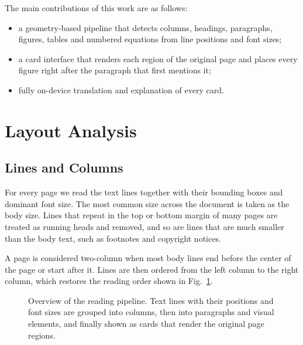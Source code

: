 \documentclass[journal]{IEEEtran}
\begin{document}
The main contributions of this work are as follows:
\begin{itemize}
\item a geometry-based pipeline that detects columns, headings, paragraphs, figures, tables and numbered equations from line positions and font sizes;
\item a card interface that renders each region of the original page and places every figure right after the paragraph that first mentions it;
\item fully on-device translation and explanation of every card.
\end{itemize}

\section{Layout Analysis}
\subsection{Lines and Columns}
For every page we read the text lines together with their bounding boxes and dominant font size. The most common size across the document is taken as the body size. Lines that repeat in the top or bottom margin of many pages are treated as running heads and removed, and so are lines that are much smaller than the body text, such as footnotes and copyright notices.

A page is considered two-column when most body lines end before the center of the page or start after it. Lines are then ordered from the left column to the right column, which restores the reading order shown in Fig.~\ref{fig:pipeline}.

\begin{figure}[t]
\centering
{}
\caption{Overview of the reading pipeline. Text lines with their positions and font sizes are grouped into columns, then into paragraphs and visual elements, and finally shown as cards that render the original page regions.}
\label{fig:pipeline}
\end{figure}
\end{document}
